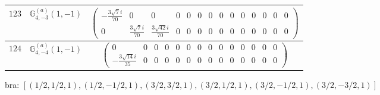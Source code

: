 \documentclass[fleqn,8pt,landscape]{jsarticle}
\begin{document}
\begin{center}
\begin{longtable}{ccc}
$ 123 $ & $ \mathbb{G}_{4,-3}^{(a)}(1,-1) $ & $ \begin{pmatrix} - \frac{3 \sqrt{7} i}{70} & 0 & 0 & 0 & 0 & 0 & 0 & 0 & 0 & 0 & 0 & 0 & 0 & 0 \\ 0 & \frac{3 \sqrt{7} i}{70} & \frac{3 \sqrt{42} i}{70} & 0 & 0 & 0 & 0 & 0 & 0 & 0 & 0 & 0 & 0 & 0 \end{pmatrix} $ \\ \hline
$ 124 $ & $ \mathbb{G}_{4,-4}^{(a)}(1,-1) $ & $ \begin{pmatrix} 0 & 0 & 0 & 0 & 0 & 0 & 0 & 0 & 0 & 0 & 0 & 0 & 0 & 0 \\ - \frac{3 \sqrt{14} i}{35} & 0 & 0 & 0 & 0 & 0 & 0 & 0 & 0 & 0 & 0 & 0 & 0 & 0 \end{pmatrix} $ \\
\end{longtable}
\end{center}
bra: $[(1/2,1/2,1),(1/2,-1/2,1),(3/2,3/2,1),(3/2,1/2,1),(3/2,-1/2,1),(3/2,-3/2,1)]$
\end{document}
